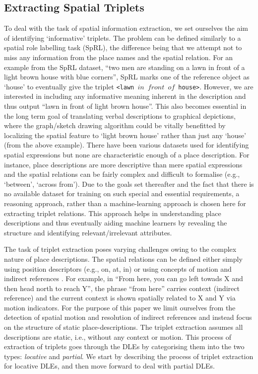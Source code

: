 \documentclass{sig-alternate}
\begin{document}
\subsection{Extracting Spatial Triplets}
To deal with the task of spatial information extraction, we set ourselves the aim of identifying `informative' triplets. The problem can be defined similarly to a spatial role labelling task (SpRL), the difference being that we attempt not to miss any information from the place names and the spatial relation. For an example from the SpRL dataset, ``two men are standing on a lawn in front of a light brown house with blue corners'', SpRL marks one of the reference object as `house' to eventually give the triplet \texttt{<lawn $in$ $front$ $of$  house>}. However, we are interested in including any informative meaning inherent in the description and thus output ``lawn in front of light brown house''. This also becomes essential in the long term goal of translating verbal descriptions to graphical depictions, where the graph/sketch drawing algorithm could be vitally benefitted by localizing the spatial feature to `light brown house' rather than just any `house' (from the above example). There have been various datasets used for identifying spatial expressions \cite{Bateman:data,CLEF:data, parisa:semeval}  but none are characteristic enough of a place description. For instance, place descriptions are more descriptive than mere spatial expressions and the spatial relations can be fairly complex and difficult to formalise (e.g., `between', `across from').  Due to the goals set thereafter and the fact that there is no available dataset for training on such special and essential requirements, a reasoning approach, rather than a machine-learning approach is chosen here for extracting triplet relations. This approach helps in understanding place descriptions and thus eventually aiding machine learners by revealing the structure and identifying relevant/irrelevant attributes.

The task of triplet extraction poses varying challenges owing to the complex nature of place descriptions. The spatial relations can be defined either simply using position descriptors (e.g., on, at, in) or using concepts of motion and indirect references \cite{zlatev:semantics}. For example, in ``From here, you can go left towads X and then head north to reach Y'', the phrase ``from here'' carries context (indirect reference) and the current context is shown spatially related to X and Y via motion indicators. For the purpose of this paper we limit ourselves from the detection of spatial motion and resolution of indirect references and instead focus on the structure of static place-descriptions. The triplet extraction assumes all descriptions are static, i.e., without any context or motion. This process of extraction of triplets goes through the DLEs by categorising them into the two types: \textit{locative} and \textit{partial}. We start by describing the process of triplet extraction for locative DLEs, and then move forward to deal with partial DLEs.
\end{document}
